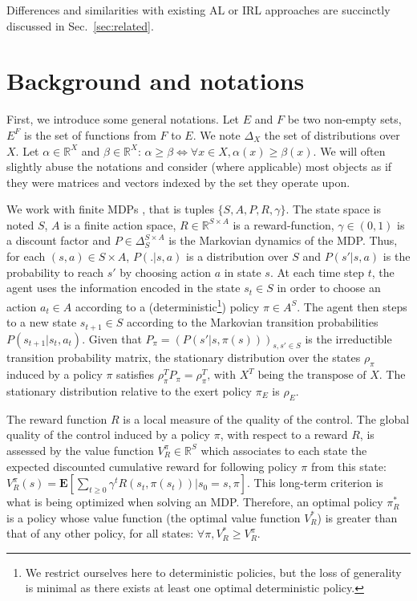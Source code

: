 \documentclass{llncs}
\newcommand{\E}{\mathbf{E}}
\begin{document}
Differences and similarities with existing AL or IRL approaches are succinctly discussed in Sec.~\ref{sec:related}.
\section{Background and notations}
\label{sec:background}
First, we introduce some general notations.
Let $E$ and $F$ be two non-empty sets, $E^F$ is the set of functions from $F$ to $E$.
We note $\Delta_X$ the set of distributions over $X$.
Let $\alpha\in\mathbb{R}^X$ and $\beta\in\mathbb{R}^X$: $\alpha\geq\beta \Leftrightarrow \forall x\in X, \alpha(x) \geq \beta(x)$. We will often slightly abuse the notations and consider (where applicable) most objects as if they were matrices and vectors indexed by the set they operate upon.

We work with finite MDPs \cite{puterman1994markov}, that is tuples $\{S,A,P,R,\gamma\}$. The state space is noted $S$, $A$ is a finite action space, $R\in\mathbb{R}^{S\times A}$ is a reward-function, $\gamma\in (0,1)$ is a discount factor and $P\in \Delta_{S}^{S\times A}$ is the Markovian dynamics of the MDP. Thus, for each $(s,a)\in S\times A$, $P(.|s,a)$ is a distribution over $S$ and $P(s'|s,a)$ is the probability to reach $s'$ by choosing action $a$ in state $s$. At each time step $t$, the agent uses the information encoded in the state $s_t\in S$ in order to choose an action $a_t \in A$ according to a (deterministic\footnote{We restrict ourselves here to deterministic policies, but the loss of generality is minimal as there exists at least one optimal deterministic policy.}) policy $\pi\in A^S$. The agent then steps to a new state $s_{t+1}\in S$ according to the Markovian transition probabilities $P(s_{t+1}|s_t,a_t)$. Given that $P_\pi = (P(s'|s,\pi(s)))_{s,s' \in S}$ is the irreductible transition probability matrix, the stationary distribution over the states $\rho_\pi$ induced by a policy $\pi$ satisfies $\rho_\pi^TP_\pi = \rho_\pi^T\textrm{, with }X^T\textrm{ being the transpose of }X$.
The stationary distribution relative to the exert policy $\pi_E$ is $\rho_E$.

The reward function $R$ is a local measure of the quality of the control. The global quality of the control induced by a policy $\pi$, with respect to a reward $R$, is assessed by the value function $V^\pi_R \in \mathbb{R}^{S}$ which associates to each state the expected discounted cumulative reward for following policy $\pi$ from this state:
$V^\pi_R(s) = \E[\sum_{t\geq 0}\gamma^tR(s_t,\pi(s_t))|s_0 = s,\pi]$.
This long-term criterion is what is being optimized when solving an MDP. Therefore, an optimal policy $\pi^*_R$ is a policy whose value function (the optimal value function $V^*_R$) is greater than that of any other policy, for all states: $\forall \pi, V^*_R\geq V^\pi_R$.
\end{document}

